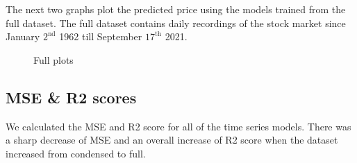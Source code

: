 \documentclass{article}
\begin{document}
The next two graphs plot the predicted price using the models trained from the full dataset. The full dataset contains daily recordings of the stock market since January $2^{\text{nd}}$ 1962 till September $17^{\text{th}}$ 2021.

\begin{figure}[H]
    \qquad
    \caption{Full plots}
    \label{fig:example}
\end{figure}

\subsection{MSE \& R2 scores}
We calculated the MSE and R2 score for all of the time series models. There was a sharp decrease of MSE and an overall increase of R2 score when the dataset increased from condensed to full.
\end{document}
